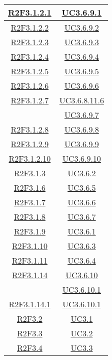 \begin{longtable}{|c|c|}
\hline
\hyperlink{R2F3.1.2.1}{R2F3.1.2.1} & \hyperlink{UC3.6.9.1}{UC3.6.9.1}\\
\hline
\hyperlink{R2F3.1.2.2}{R2F3.1.2.2} & \hyperlink{UC3.6.9.2}{UC3.6.9.2}\\
\hline
\hyperlink{R2F3.1.2.3}{R2F3.1.2.3} & \hyperlink{UC3.6.9.3}{UC3.6.9.3}\\
\hline
\hyperlink{R2F3.1.2.4}{R2F3.1.2.4} & \hyperlink{UC3.6.9.4}{UC3.6.9.4}\\
\hline
\hyperlink{R2F3.1.2.5}{R2F3.1.2.5} & \hyperlink{UC3.6.9.5}{UC3.6.9.5}\\
\hline
\hyperlink{R2F3.1.2.6}{R2F3.1.2.6} & \hyperlink{UC3.6.9.6}{UC3.6.9.6}\\
\hline
\hyperlink{R2F3.1.2.7}{R2F3.1.2.7} & \hyperlink{UC3.6.8.11.6}{UC3.6.8.11.6}\\
& \hyperlink{UC3.6.9.7}{UC3.6.9.7}\\
\hline
\hyperlink{R2F3.1.2.8}{R2F3.1.2.8} & \hyperlink{UC3.6.9.8}{UC3.6.9.8}\\
\hline
\hyperlink{R2F3.1.2.9}{R2F3.1.2.9} & \hyperlink{UC3.6.9.9}{UC3.6.9.9}\\
\hline
\hyperlink{R2F3.1.2.10}{R2F3.1.2.10} & \hyperlink{UC3.6.9.10}{UC3.6.9.10}\\
\hline
\hyperlink{R2F3.1.3}{R2F3.1.3} & \hyperlink{UC3.6.2}{UC3.6.2}\\
\hline
\hyperlink{R2F3.1.6}{R2F3.1.6} & \hyperlink{UC3.6.5}{UC3.6.5}\\
\hline
\hyperlink{R2F3.1.7}{R2F3.1.7} & \hyperlink{UC3.6.6}{UC3.6.6}\\
\hline
\hyperlink{R2F3.1.8}{R2F3.1.8} & \hyperlink{UC3.6.7}{UC3.6.7}\\
\hline
\hyperlink{R2F3.1.9}{R2F3.1.9} & \hyperlink{UC3.6.1}{UC3.6.1}\\
\hline
\hyperlink{R2F3.1.10}{R2F3.1.10} & \hyperlink{UC3.6.3}{UC3.6.3}\\
\hline
\hyperlink{R2F3.1.11}{R2F3.1.11} & \hyperlink{UC3.6.4}{UC3.6.4}\\
\hline
\hyperlink{R2F3.1.14}{R2F3.1.14} & \hyperlink{UC3.6.10}{UC3.6.10}\\
& \hyperlink{UC3.6.10.1}{UC3.6.10.1}\\
\hline
\hyperlink{R2F3.1.14.1}{R2F3.1.14.1} & \hyperlink{UC3.6.10.1}{UC3.6.10.1}\\
\hline
\hyperlink{R2F3.2}{R2F3.2} & \hyperlink{UC3.1}{UC3.1}\\
\hline
\hyperlink{R2F3.3}{R2F3.3} & \hyperlink{UC3.2}{UC3.2}\\
\hline
\hyperlink{R2F3.4}{R2F3.4} & \hyperlink{UC3.3}{UC3.3}\\

\end{longtable}
